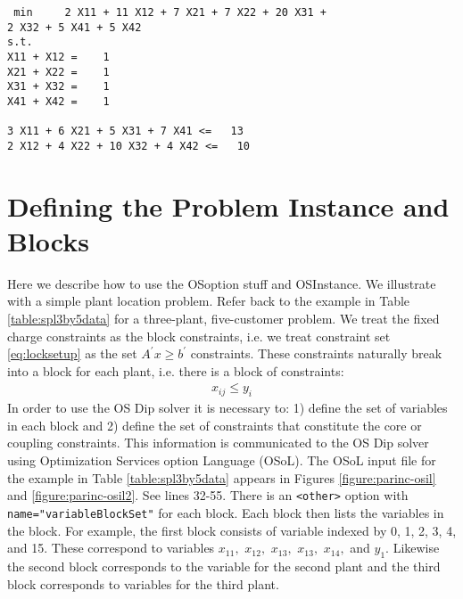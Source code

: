 \documentclass[11pt]{article}
\newcounter{Fig}
\begin{document}
\begin{verbatim}
 min     2 X11 + 11 X12 + 7 X21 + 7 X22 + 20 X31 + 
2 X32 + 5 X41 + 5 X42
s.t.
X11 + X12 =    1
X21 + X22 =    1
X31 + X32 =    1
X41 + X42 =    1

3 X11 + 6 X21 + 5 X31 + 7 X41 <=   13
2 X12 + 4 X22 + 10 X32 + 4 X42 <=   10
\end{verbatim}
 

 

\section{Defining the Problem Instance and Blocks}\label{section:defineinstance}

Here we describe how to use the OSoption stuff and OSInstance.  We illustrate
with a simple plant location problem. Refer back to the example in Table
\ref{table:spl3by5data} for a three-plant, five-customer problem. We treat the
fixed charge constraints as the block constraints, i.e. we treat constraint set
\ref{eq:locksetup} as the set $A^{\prime} x \ge b^{\prime}$ constraints. These
constraints naturally break into a block for each plant, i.e. there is a block
of constraints:
\begin{eqnarray}
x_{ij} \le y_{i}
\end{eqnarray}
In order to use the OS Dip solver it is necessary to: 1) define the set of
variables in each block and 2) define the set of constraints that constitute the
core or coupling constraints. This information is communicated to the OS Dip
solver using Optimization Services option Language (OSoL). The OSoL input file
for the example in Table \ref{table:spl3by5data} appears in Figures
\ref{figure:parinc-osil} and \ref{figure:parinc-osil2}.  See lines 32-55. There
is an {\tt <other>} option with {\tt name="variableBlockSet"} for each block.
Each block then lists the variables in the block. For example, the first block
consists of variable indexed by 0, 1, 2, 3, 4, and 15. These correspond to
variables $x_{11},$  $x_{12},$  $x_{13},$  $x_{13},$ $x_{14},$ and  $y_{1}.$
Likewise the second block corresponds to the variable for the second plant and
the third block corresponds to variables for the third plant.
\end{document}
